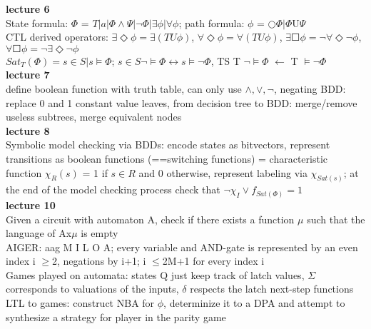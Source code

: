 \documentclass[12pt]{article}
\begin{document}
\textbf{lecture 6}\\
State formula: $\Phi$ = $T|a|\Phi\wedge\Psi|\neg\Phi|\exists\phi|\forall\phi$; path formula: $\phi$ = $\Circle\Phi|\Phi$U$\Psi$\\
CTL derived operators: $\exists\Diamond\phi = \exists(TU\phi)$, $\forall\Diamond\phi = \forall(TU\phi)$, $\exists\Square\phi = \neg\forall\Diamond\neg\phi$, $\forall\Square\phi = \neg\exists\Diamond\neg\phi$\\
$Sat_T(\Phi) = {s\in S|s \models \Phi}$; $s \in S\neg\models\Phi \leftrightarrow s\models\neg\Phi$, TS T $\neg\models\Phi$ $\leftarrow$ T $\models\neg$$\Phi$ \\
\textbf{lecture 7}\\
define boolean function with truth table, can only use $\wedge, \vee, \neg$, negating BDD: replace 0 and 1 constant value leaves, from decision tree to BDD: merge/remove useless subtrees, merge equivalent nodes\\
\textbf{lecture 8}\\
Symbolic model checking via BDDs: encode states as bitvectors, represent transitions as boolean functions (==switching functions) = characteristic function $\chi_R(s)$ = 1 if $s \in R$ and 0 otherwise, represent labeling via $\chi_{Sat(s)}$; at the end of the model checking process check that $\neg\chi_I\vee f_{Sat(\Phi)} = 1$\\
\textbf{lecture 10}\\
Given a circuit with automaton A, check if there exists a function $\mu$ such that the language of Ax$\mu$ is empty\\
AIGER: aag M I L O A; every variable and AND-gate is represented by an even index i $\geq$2, negations by i+1; i $\leq$2M+1 for every index i\\
Games played on automata: states Q just keep track of latch values, $\Sigma$ corresponds to valuations of the inputs, $\delta$ respects the latch next-step functions\\
LTL to games: construct NBA for $\phi$, determinize it to a DPA and attempt to synthesize a strategy for player in the parity game
\end{document}
